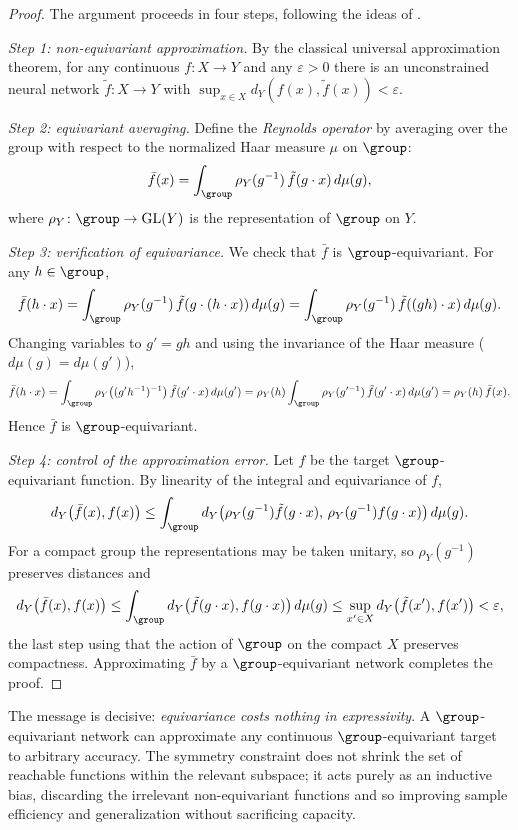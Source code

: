 \begin{proof}
The argument proceeds in four steps, following the ideas of
\citet{yarotsky2022}.

\emph{Step 1: non-equivariant approximation.} By the classical universal
approximation theorem, for any continuous $f \colon X \to Y$ and any
$\varepsilon > 0$ there is an unconstrained neural network
$\tilde f \colon X \to Y$ with
$\sup_{x \in X} d_Y(f(x), \tilde f(x)) < \varepsilon$.

\emph{Step 2: equivariant averaging.} Define the \emph{Reynolds operator} by
averaging over the group with respect to the normalized Haar measure $\mu$ on
$\group$:
\[
  \bar f(x) = \int_{\group} \rho_Y(g^{-1})\, \tilde f(g \cdot x)\, d\mu(g),
\]
where $\rho_Y \colon \group \to \GL(Y)$ is the representation of $\group$ on $Y$.

\emph{Step 3: verification of equivariance.} We check that $\bar f$ is
$\group$-equivariant. For any $h \in \group$,
\[
  \bar f(h \cdot x)
    = \int_{\group} \rho_Y(g^{-1})\, \tilde f(g \cdot (h \cdot x))\, d\mu(g)
    = \int_{\group} \rho_Y(g^{-1})\, \tilde f((gh) \cdot x)\, d\mu(g).
\]
Changing variables to $g' = gh$ and using the invariance of the Haar measure
($d\mu(g) = d\mu(g')$),
\[
  \bar f(h \cdot x)
    = \int_{\group} \rho_Y\bigl((g'h^{-1})^{-1}\bigr)\, \tilde f(g' \cdot x)\, d\mu(g')
    = \rho_Y(h) \int_{\group} \rho_Y(g'^{-1})\, \tilde f(g' \cdot x)\, d\mu(g')
    = \rho_Y(h)\, \bar f(x).
\]
Hence $\bar f$ is $\group$-equivariant.

\emph{Step 4: control of the approximation error.} Let $f$ be the target
$\group$-equivariant function. By linearity of the integral and equivariance of
$f$,
\[
  d_Y\bigl(\bar f(x), f(x)\bigr)
    \le \int_{\group} d_Y\bigl(\rho_Y(g^{-1}) \tilde f(g \cdot x),\,
        \rho_Y(g^{-1}) f(g \cdot x)\bigr)\, d\mu(g).
\]
For a compact group the representations may be taken unitary, so $\rho_Y(g^{-1})$
preserves distances and
\[
  d_Y\bigl(\bar f(x), f(x)\bigr)
    \le \int_{\group} d_Y\bigl(\tilde f(g \cdot x), f(g \cdot x)\bigr)\, d\mu(g)
    \le \sup_{x' \in X} d_Y\bigl(\tilde f(x'), f(x')\bigr) < \varepsilon,
\]
the last step using that the action of $\group$ on the compact $X$ preserves
compactness. Approximating $\bar f$ by a $\group$-equivariant network completes
the proof. \qedhere
\end{proof}

The message is decisive: \emph{equivariance costs nothing in expressivity}. A
$\group$-equivariant network can approximate any continuous $\group$-equivariant
target to arbitrary accuracy. The symmetry constraint does not shrink the set of
reachable functions within the relevant subspace; it acts purely as an inductive
bias, discarding the irrelevant non-equivariant functions and so improving
sample efficiency and generalization without sacrificing capacity.

